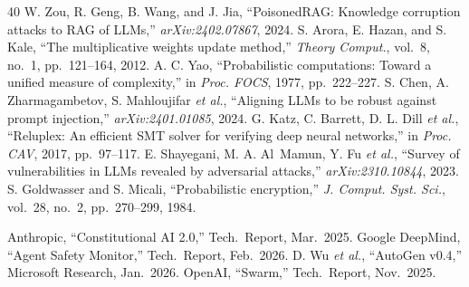 \documentclass[journal,10pt]{IEEEtran}
\begin{document}
\begin{thebibliography}{40}
 W. Zou, R. Geng, B. Wang, and J. Jia, ``PoisonedRAG: Knowledge corruption attacks to RAG of LLMs,'' \emph{arXiv:2402.07867}, 2024.
 S. Arora, E. Hazan, and S. Kale, ``The multiplicative weights update method,'' \emph{Theory Comput.}, vol.~8, no.~1, pp.\ 121--164, 2012.
 A. C. Yao, ``Probabilistic computations: Toward a unified measure of complexity,'' in \emph{Proc. FOCS}, 1977, pp.\ 222--227.
 S. Chen, A. Zharmagambetov, S. Mahloujifar \emph{et al.}, ``Aligning LLMs to be robust against prompt injection,'' \emph{arXiv:2401.01085}, 2024.
 G. Katz, C. Barrett, D. L. Dill \emph{et al.}, ``Reluplex: An efficient SMT solver for verifying deep neural networks,'' in \emph{Proc. CAV}, 2017, pp.\ 97--117.
 E. Shayegani, M. A. Al~Mamun, Y. Fu \emph{et al.}, ``Survey of vulnerabilities in LLMs revealed by adversarial attacks,'' \emph{arXiv:2310.10844}, 2023.
 S. Goldwasser and S. Micali, ``Probabilistic encryption,'' \emph{J. Comput. Syst. Sci.}, vol.~28, no.~2, pp.\ 270--299, 1984.

 Anthropic, ``Constitutional AI 2.0,'' Tech.\ Report, Mar.\ 2025.
 Google DeepMind, ``Agent Safety Monitor,'' Tech.\ Report, Feb.\ 2026.
 D. Wu \emph{et al.}, ``AutoGen v0.4,'' Microsoft Research, Jan.\ 2026.
 OpenAI, ``Swarm,'' Tech.\ Report, Nov.\ 2025.
\end{thebibliography}
\end{document}
